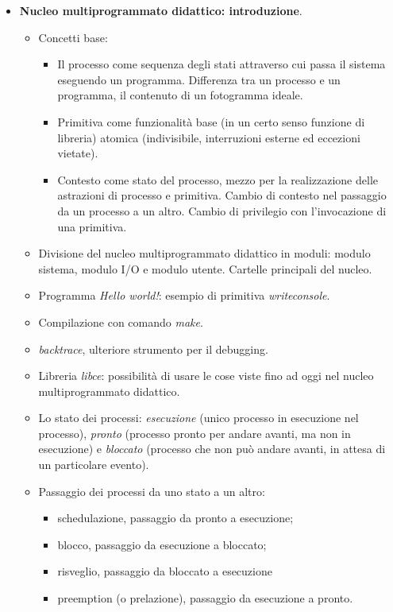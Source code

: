 \begin{itemize}
\begin{itemize}
\begin{itemize}
		\end{itemize}
	\end{itemize}
	\clearpage 
	\item \textbf{Nucleo multiprogrammato didattico: introduzione}.
	\begin{itemize}
		\item Concetti base:
		\begin{itemize}
			\item Il processo come sequenza degli stati attraverso cui passa il sistema eseguendo un programma. Differenza tra un processo e un programma, il contenuto di un fotogramma ideale.
			\item Primitiva come funzionalità base (in un certo senso funzione di libreria) atomica (indivisibile, interruzioni esterne ed eccezioni vietate).
			\item Contesto come stato del processo, mezzo per la realizzazione delle astrazioni di processo e primitiva. Cambio di contesto nel passaggio da un processo a un altro. Cambio di privilegio con l'invocazione di una primitiva.
		\end{itemize}
		\item Divisione del nucleo multiprogrammato didattico in moduli: modulo sistema, modulo I/O e modulo utente. Cartelle principali del nucleo.
		\item Programma \emph{Hello world!}: esempio di primitiva \emph{writeconsole}.
		\item Compilazione con comando \emph{make}.
		\item \emph{backtrace}, ulteriore strumento per il debugging.
		\item Libreria \emph{libce}: possibilità di usare le cose viste fino ad oggi nel nucleo multiprogrammato didattico.
		\item Lo stato dei processi: \emph{esecuzione} (unico processo in esecuzione nel processo), \emph{pronto} (processo pronto per andare avanti, ma non in esecuzione) e \emph{bloccato} (processo che non può andare avanti, in attesa di un particolare evento).
		\item Passaggio dei processi da uno stato a un altro:
		\begin{itemize}
			\item schedulazione, passaggio da pronto a esecuzione;
			\item blocco, passaggio da esecuzione a bloccato;
			\item risveglio, passaggio da bloccato a esecuzione
			\item preemption (o prelazione), passaggio da esecuzione a pronto.

\end{itemize}
\end{itemize}
\end{itemize}
